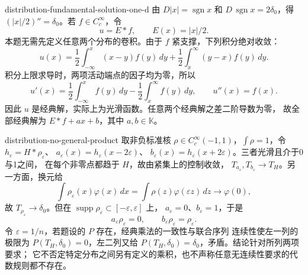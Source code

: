 \begin{solution}{distribution-fundamental-solution-one-d}
由 \(D|x|=\operatorname{sgn}x\) 和
\(D\,\operatorname{sgn}x=2\delta_0\)，得
\((|x|/2)''=\delta_0\)。若 \(f\in C_c^\infty\)，令
\[
 u=E*f,\qquad E(x)=|x|/2.
\]
本题无需先定义任意两个分布的卷积。由于 \(f\) 紧支撑，下列积分绝对收敛：
\[
 u(x)=\frac12\int_{-\infty}^x(x-y)f(y)\,dy
      +\frac12\int_x^\infty(y-x)f(y)\,dy.
\]
积分上限求导时，两项活动端点的因子均为零，所以
\[
 u'(x)=\frac12\int_{-\infty}^x f(y)\,dy
       -\frac12\int_x^\infty f(y)\,dy,\qquad u''(x)=f(x).
\]
因此 \(u\) 是经典解，实际上为光滑函数。任意两个经典解之差二阶导数为零，
故全部经典解为 \(E*f+ax+b\)，其中 \(a,b\in\mathbb K\)。
\end{solution}

\begin{solution}{distribution-no-general-product}
取非负标准核 \(\rho\in C_c^\infty(-1,1)\)，\(\int\rho=1\)，令
\(h_\varepsilon=H*\rho_\varepsilon\)、
\(a_\varepsilon(x)=h_\varepsilon(x-2\varepsilon)\)、
\(b_\varepsilon(x)=h_\varepsilon(x+2\varepsilon)\)。三者光滑且介于0与1之间，
在每个非零点都趋于 \(H\)，故由紧集上的控制收敛，
\(T_{a_\varepsilon},T_{b_\varepsilon}\to T_H\)。另一方面，换元给
\[
 \int\rho_\varepsilon(x)\varphi(x)\,dx
 =\int\rho(z)\varphi(\varepsilon z)\,dz\longrightarrow\varphi(0),
\]
故 \(T_{\rho_\varepsilon}\to\delta_0\)。但在
\(\operatorname{supp}\rho_\varepsilon\subset[-\varepsilon,\varepsilon]\) 上，
\(a_\varepsilon=0\)、\(b_\varepsilon=1\)，于是
\[
 a_\varepsilon\rho_\varepsilon=0,\qquad
 b_\varepsilon\rho_\varepsilon=\rho_\varepsilon.
\]
令 \(\varepsilon=1/n\)，若题设的 \(P\) 存在，经典乘法的一致性与联合序列
连续性使左一列的极限为 \(P(T_H,\delta_0)=0\)，左二列又给
\(P(T_H,\delta_0)=\delta_0\)，矛盾。结论针对所列两项要求；
它不否定特定分布之间另有定义的乘积，也不声称任意无连续性要求的代数规则都不存在。
\end{solution}
